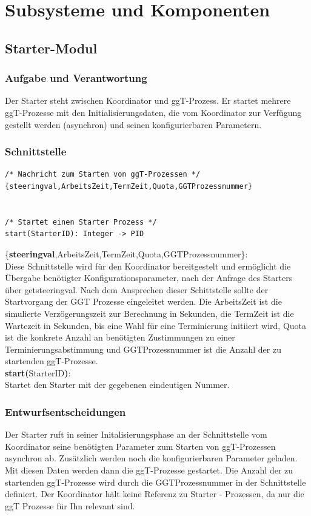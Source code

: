 \documentclass{article}
\begin{document}
\newpage

\section{Subsysteme und Komponenten}

\subsection{Starter-Modul}
\subsubsection{Aufgabe und Verantwortung}
Der Starter steht zwischen Koordinator und ggT-Prozess. Er startet mehrere ggT-Prozesse mit den Initialisierungsdaten,
die vom Koordinator zur Verfügung gestellt werden (asynchron) und seinen konfigurierbaren Parametern.

\subsubsection{Schnittstelle}
\begin{lstlisting}
/* Nachricht zum Starten von ggT-Prozessen */
{steeringval,ArbeitsZeit,TermZeit,Quota,GGTProzessnummer}


/* Startet einen Starter Prozess */
start(StarterID): Integer -> PID
\end{lstlisting}
\{\textbf{steeringval},ArbeitsZeit,TermZeit,Quota,GGTProzessnummer\}:\\
Diese Schnittstelle wird für den Koordinator bereitgestelt und ermöglicht die Übergabe benötigter Konfigurationsparameter,
nach der Anfrage des Starters über getsteeringval.
Nach dem Ansprechen dieser Schittstelle sollte der Startvorgang der GGT Prozesse eingeleitet werden. Die ArbeitsZeit ist die simulierte Verzögerungszeit zur Berechnung in Sekunden, die TermZeit ist die
Wartezeit in Sekunden, bis eine Wahl für eine Terminierung initiiert wird, Quota ist die konkrete Anzahl an
benötigten Zustimmungen zu einer Terminierungsabstimmung und GGTProzessnummer ist die Anzahl der zu startenden
ggT-Prozesse.\\

\textbf{start(}StarterID\textbf{)}:\\
Startet den Starter mit der gegebenen eindeutigen Nummer.\\

\subsubsection{Entwurfsentscheidungen}
Der Starter ruft in seiner Initalisierungsphase an der Schnittstelle vom Koordinator seine benötigten Parameter zum
Starten von ggT-Prozessen asynchron ab. Zusätzlich werden noch die konfigurierbaren Parameter geladen. Mit diesen Daten
werden dann die ggT-Prozesse gestartet. Die Anzahl der zu startenden ggT-Prozesse wird durch die GGTProzessnummer in der
Schnittstelle definiert. Der Koordinator hält keine Referenz zu Starter - Prozessen, da nur die ggT Prozesse für Ihn
relevant sind.
\end{document}
